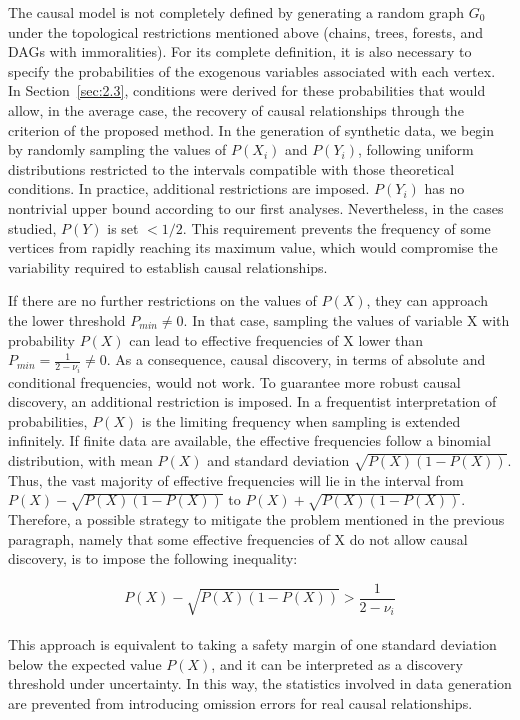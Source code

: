 \documentclass[12pt,a4paper]{report}
\begin{document}
The causal model is not completely defined by generating a random graph $G_0$ under the topological restrictions mentioned above (chains, trees, forests, and DAGs with immoralities). For its complete definition, it is also necessary to specify the probabilities of the exogenous variables associated with each vertex. In Section~\ref{sec:2.3}, conditions were derived for these probabilities that would allow, in the average case, the recovery of causal relationships through the criterion of the proposed method. In the generation of synthetic data, we begin by randomly sampling the values of $P(X_i)$ and $P(Y_i)$, following uniform distributions restricted to the intervals compatible with those theoretical conditions. In practice, additional restrictions are imposed. $P(Y_i)$ has no nontrivial upper bound according to our first analyses. Nevertheless, in the cases studied, $P(Y)$ is set $< 1/2$. This requirement prevents the frequency of some vertices from rapidly reaching its maximum value, which would compromise the variability required to establish causal relationships.

If there are no further restrictions on the values of $P(X)$, they can approach the lower threshold $P_{min} \neq 0$. In that case, sampling the values of variable X with probability $P(X)$ can lead to effective frequencies of X lower than $P_{min} = \frac{1}{2 - \nu_i} \neq 0$. As a consequence, causal discovery, in terms of absolute and conditional frequencies, would not work. To guarantee more robust causal discovery, an additional restriction is imposed. In a frequentist interpretation of probabilities, $P(X)$ is the limiting frequency when sampling is extended infinitely. If finite data are available, the effective frequencies follow a binomial distribution, with mean $P(X)$ and standard deviation $\sqrt{P(X)(1 - P(X))}$. Thus, the vast majority of effective frequencies will lie in the interval from $P(X) - \sqrt{P(X)(1 - P(X))}$ to $P(X) + \sqrt{P(X)(1 - P(X))}$. Therefore, a possible strategy to mitigate the problem mentioned in the previous paragraph, namely that some effective frequencies of X do not allow causal discovery, is to impose the following inequality:

\begin{equation}
\label{eq:omega}
P(X) -\sqrt{P(X)(1 - P(X))} > \frac{1}{2 - \nu_i}
\end{equation} 
\\ 
This approach is equivalent to taking a safety margin of one standard deviation below the expected value $P(X)$, and it can be interpreted as a discovery threshold under uncertainty. In this way, the statistics involved in data generation are prevented from introducing omission errors for real causal relationships.  
\end{document}
